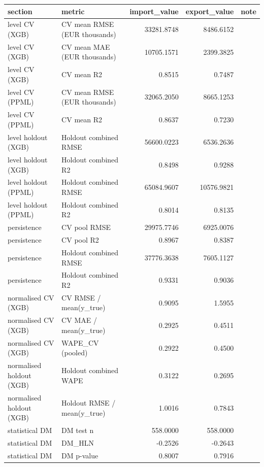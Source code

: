 \begin{tabular}{llrrl}
\toprule
section & metric & import\_value & export\_value & note \\
\midrule
level CV (XGB) & CV mean RMSE (EUR thousands) & 33281.8748 & 8486.6152 &  \\
level CV (XGB) & CV mean MAE (EUR thousands) & 10705.1571 & 2399.3825 &  \\
level CV (XGB) & CV mean R2 & 0.8515 & 0.7487 &  \\
level CV (PPML) & CV mean RMSE (EUR thousands) & 32065.2050 & 8665.1253 &  \\
level CV (PPML) & CV mean R2 & 0.8637 & 0.7230 &  \\
level holdout (XGB) & Holdout combined RMSE & 56600.0223 & 6536.2636 &  \\
level holdout (XGB) & Holdout combined R2 & 0.8498 & 0.9288 &  \\
level holdout (PPML) & Holdout combined RMSE & 65084.9607 & 10576.9821 &  \\
level holdout (PPML) & Holdout combined R2 & 0.8014 & 0.8135 &  \\
persistence & CV pool RMSE & 29975.7746 & 6925.0076 &  \\
persistence & CV pool R2 & 0.8967 & 0.8387 &  \\
persistence & Holdout combined RMSE & 37776.3638 & 7605.1127 &  \\
persistence & Holdout combined R2 & 0.9331 & 0.9036 &  \\
normalised CV (XGB) & CV RMSE / mean(y\_true) & 0.9095 & 1.5955 &  \\
normalised CV (XGB) & CV MAE / mean(y\_true) & 0.2925 & 0.4511 &  \\
normalised CV (XGB) & WAPE\_CV (pooled) & 0.2922 & 0.4500 &  \\
normalised holdout (XGB) & Holdout combined WAPE & 0.3122 & 0.2695 &  \\
normalised holdout (XGB) & Holdout RMSE / mean(y\_true) & 1.0016 & 0.7843 &  \\
statistical DM & DM test n & 558.0000 & 558.0000 &  \\
statistical DM & DM\_HLN & -0.2526 & -0.2643 &  \\
statistical DM & DM p-value & 0.8007 & 0.7916 &  \\
\bottomrule
\end{tabular}

